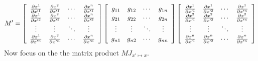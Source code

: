 \documentclass{article}
\begin{document}
\[
M' = 
\left[
\begin{array}{cccc}
\frac{\partial x^1}{\partial x^{\prime 1}} & \frac{\partial x^2}{\partial x^{\prime 1}} & \cdots & \frac{\partial x^n}{\partial x^{\prime 1}} \\
\frac{\partial x^1}{\partial x^{\prime 2}} & \frac{\partial x^2}{\partial x^{\prime 2}} & \cdots & \frac{\partial x^n}{\partial x^{\prime 2}} \\
\vdots & \vdots & \ddots & \vdots \\
\frac{\partial x^1}{\partial x^{\prime n}} & \frac{\partial x^2}{\partial x^{\prime n}} & \cdots & \frac{\partial x^n}{\partial x^{\prime n}} \\
\end{array}
\right]
\left[
\begin{array}{cccc}
g_{11} & g_{12} & \cdots & g_{1n} \vphantom{\frac{\partial x^1}{\partial x^{\prime n}}} \\
g_{21} & g_{22} & \cdots & g_{2n} \vphantom{\frac{\partial x^1}{\partial x^{\prime n}}} \\
\vdots & \vdots & \ddots & \vdots \\
g_{n1} & g_{n2} & \cdots & g_{nn} \vphantom{\frac{\partial x^1}{\partial x^{\prime n}}} \\
\end{array}
\right]
\left[
\begin{array}{cccc}
\frac{\partial x^1}{\partial x^{\prime 1}} & \frac{\partial x^1}{\partial x^{\prime 2}} & \cdots & \frac{\partial x^1}{\partial x^{\prime n}} \\
\frac{\partial x^2}{\partial x^{\prime 1}} & \frac{\partial x^2}{\partial x^{\prime 2}} & \cdots & \frac{\partial x^2}{\partial x^{\prime n}} \\
\vdots & \vdots & \ddots & \vdots \\
\frac{\partial x^n}{\partial x^{\prime 1}} & \frac{\partial x^n}{\partial x^{\prime 2}} & \cdots & \frac{\partial x^n}{\partial x^{\prime n}} \vphantom{\frac{\partial x^1}{\partial x^{\prime n}}} \\
\end{array}
\right]
\]
Now focus on the the matrix product $M J_{x' \mapsto x}$.
\end{document}
